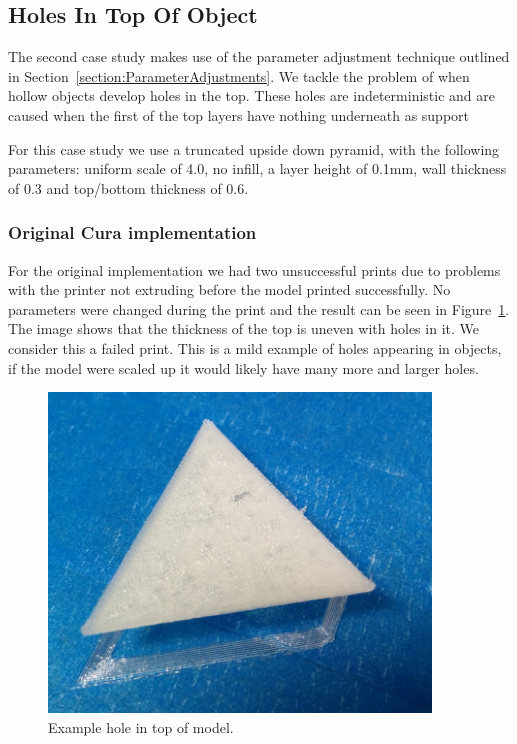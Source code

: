 \documentclass[pdftex, 11pt]{report} %
\begin{document}
\subsection{Holes In Top Of Object}
The second case study makes use of the parameter adjustment technique outlined in Section~\ref{section:ParameterAdjustments}. We tackle the problem of when hollow objects develop holes in the top. These holes are indeterministic and are caused when the first of the top layers have nothing underneath as support

For this case study we use a truncated upside down pyramid, with the following parameters: uniform scale of 4.0, no infill, a layer height of 0.1mm, wall thickness of 0.3 and top/bottom thickness of 0.6. 

\subsubsection{Original Cura implementation}

For the original implementation we had two unsuccessful prints due to problems with the printer not extruding before the model printed successfully. No parameters were changed during the print and the result can be seen in Figure~\ref{figure:PyramidOld1}. The image shows that the thickness of the top is uneven with holes in it. We consider this a failed print. This is a mild example of holes appearing in objects, if the model were scaled up it would likely have many more and larger holes. 

\begin{figure}[H]
  \centering
  \includegraphics[width=4in]{PyramidOld1.png}
  \caption{Example hole in top of model.}
  \label{figure:PyramidOld1}
\end{figure}
\end{document}
